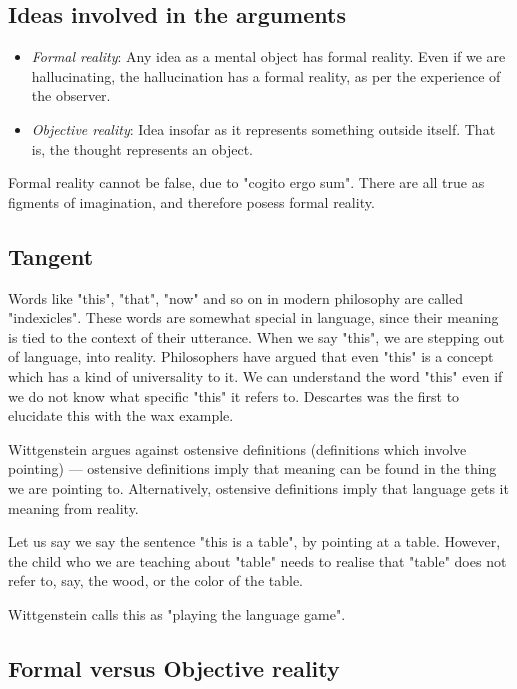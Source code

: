 \documentclass[11pt]{book}
\begin{document}
\subsection{Ideas involved in the arguments}

\begin{itemize}
    \item \emph{Formal reality}: Any idea as a mental object has formal reality. Even
        if we are hallucinating, the hallucination has a formal reality, as per
        the experience of the observer.
    \item \emph{Objective reality}: Idea insofar as it represents something outside
        itself. That is, the thought represents an object.
\end{itemize}

Formal reality cannot be false, due to "cogito ergo sum". There are all true as
figments of imagination, and therefore posess formal reality.

\subsection{Tangent}
Words like "this", "that", "now" and so on in modern philosophy are called
"indexicles". These words are somewhat special in language, since their meaning
is tied to the context of their utterance. When we say "this", we are stepping
out of language, into reality. Philosophers have argued that even "this" is a
concept which has a kind of universality to it. We can understand the word
"this" even if we do not know what specific "this" it refers to. Descartes was
the first to elucidate this with the wax example.

Wittgenstein argues against ostensive definitions (definitions which involve
pointing) --- ostensive definitions imply that meaning can be found in the
thing we are pointing to.  Alternatively, ostensive definitions imply that
language gets it meaning from reality. 

Let us say we say the sentence "this is a table", by pointing at a table.
However, the child who we are teaching about "table" needs to realise that
"table" does not refer to, say, the wood, or the color of the table.  

Wittgenstein calls this as "playing the language game".

\subsection{Formal versus Objective reality}
\end{document}
